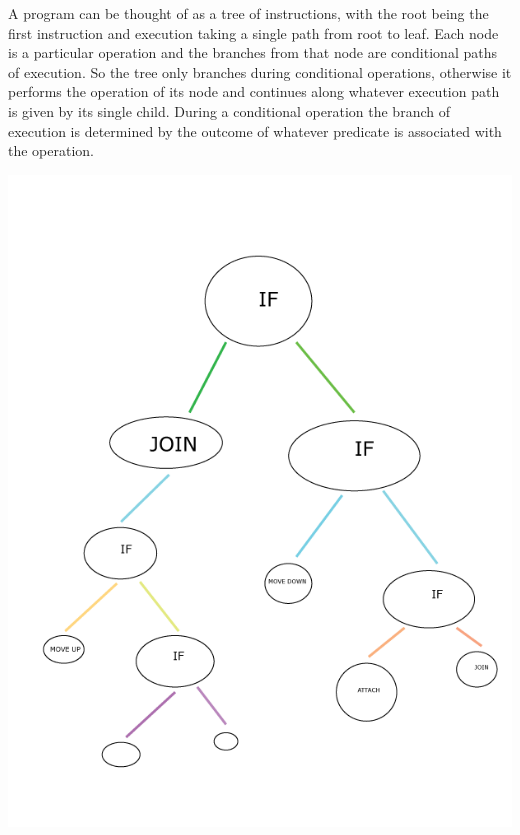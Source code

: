 \documentclass[12pt]{article}
\begin{document}
A program can be thought of as a tree of instructions, with the root being the first instruction and execution taking a single path from root to leaf.  Each node is a particular operation and the branches from that node are conditional paths of execution.  So the tree only branches during conditional operations, otherwise it performs the operation of its node and continues along whatever execution path is given by its single child.  During a conditional operation the branch of execution is determined by the outcome of whatever predicate is associated with the operation.  

\begin{center}
\includegraphics[scale=0.6]{treerainbow.png}
\end{center}
\end{document}
